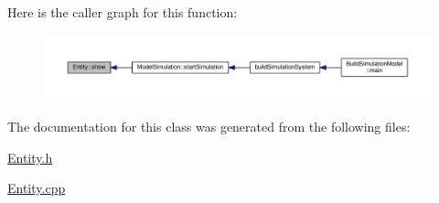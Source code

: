 Here is the caller graph for this function\+:\nopagebreak
\begin{figure}[H]
\begin{center}
\leavevmode
\includegraphics[width=350pt]{class_entity_a86cc324050b451b31b134943e7978e36_icgraph}
\end{center}
\end{figure}




The documentation for this class was generated from the following files\+:\begin{DoxyCompactItemize}
\item 
\hyperlink{_entity_8h}{Entity.\+h}\item 
\hyperlink{_entity_8cpp}{Entity.\+cpp}\end{DoxyCompactItemize}
